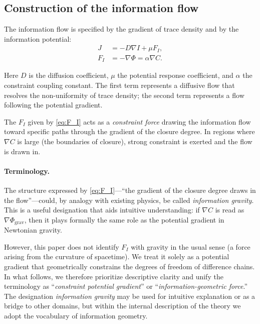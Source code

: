 \subsection{Construction of the information flow}
\label{subsec:info_flow}

The information flow is specified by the gradient of trace density and by the information potential:
\begin{align}
J &= -D \nabla I + \mu F_I, \label{eq:J}\\
F_I &= -\nabla \Phi = \alpha \nabla C. \label{eq:F_I}
\end{align}

Here $D$ is the diffusion coefficient, $\mu$ the potential response coefficient, and $\alpha$ the constraint coupling constant. The first term represents a diffusive flow that resolves the non-uniformity of trace density; the second term represents a flow following the potential gradient.

The $F_I$ given by \eqref{eq:F_I} acts as a \emph{constraint force} drawing the information flow toward specific paths through the gradient of the closure degree. In regions where $\nabla C$ is large (the boundaries of closure), strong constraint is exerted and the flow is drawn in.

\paragraph{Terminology.}
The structure expressed by \eqref{eq:F_I}---``the gradient of the closure degree draws in the flow''---could, by analogy with existing physics, be called \emph{information gravity}. This is a useful designation that aids intuitive understanding: if $\nabla C$ is read as $\nabla \Phi_{\mathrm{grav}}$, then it plays formally the same role as the potential gradient in Newtonian gravity.

However, this paper does not identify $F_I$ with gravity in the usual sense (a force arising from the curvature of spacetime). We treat it solely as a potential gradient that geometrically constrains the degrees of freedom of difference chains. In what follows, we therefore prioritize descriptive clarity and unify the terminology as ``\emph{constraint potential gradient}'' or ``\emph{information-geometric force}.'' The designation \emph{information gravity} may be used for intuitive explanation or as a bridge to other domains, but within the internal description of the theory we adopt the vocabulary of information geometry.

